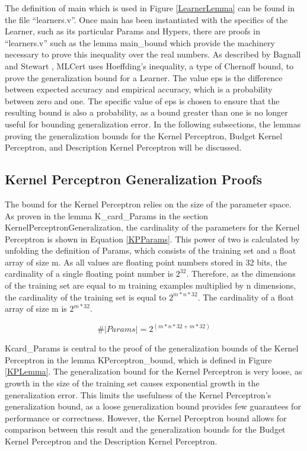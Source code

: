 The definition of main which is used in Figure \ref{LearnerLemma} can be found in the file ``learners.v''. Once main has been instantiated with the specifics of the Learner, such as its particular Params and Hypers, there are proofs in ``learners.v'' such as the lemma main\_bound which provide the machinery necessary to prove this inequality over the real numbers. As described by Bagnall and Stewart \cite{BS19}, MLCert uses Hoeffding's inequality, a type of Chernoff bound, to prove the generalization bound for a Learner. The value eps is the difference between expected accuracy and empirical accuracy, which is a probability between zero and one. The specific value of eps is chosen to ensure that the resulting bound is also a probability, as a bound greater than one is no longer useful for bounding generalization error. In the following subsections, the lemmas proving the generalization bounds for the Kernel Perceptron, Budget Kernel Perceptron, and Description Kernel Perceptron will be discussed.
\subsection{Kernel Perceptron Generalization Proofs}\label{KPProofs}
The bound for the Kernel Perceptron relies on the size of the parameter space. As proven in the lemma K\_card\_Params in the section KernelPerceptronGeneralization, the cardinality of the parameters for the Kernel Perceptron is shown in Equation \ref{KPParams}. This power of two is calculated by unfolding the definition of Params, which consists of the training set and a float array of size m. As all values are floating point numbers stored in 32 bits, the cardinality of a single floating point number is $2^{32}$. Therefore, as the dimensions of the training set are equal to m training examples multiplied by n dimensions, the cardinality of the training set is equal to $2^{m*n*32}$. The cardinality of a float array of size m is $2^{m * 32}$. 

\begin{equation} \label{KPParams}
 \#|Params| = 2^{(m*n*32 + m*32)}
\end{equation}

Kcard\_Params is central to the proof of the generalization bounds of the Kernel Perceptron in the lemma KPerceptron\_bound, which is defined in Figure \ref{KPLemma}. The generalization bound for the Kernel Perceptron is very loose, as growth in the size of the training set causes exponential growth in the generalization error. This limits the usefulness of the Kernel Perceptron's generalization bound, as a loose generalization bound provides few guarantees for performance or correctness. However, the Kernel Perceptron bound allows for comparison between this result and the generalization bounds for the Budget Kernel Perceptron and the Description Kernel Perceptron. 


